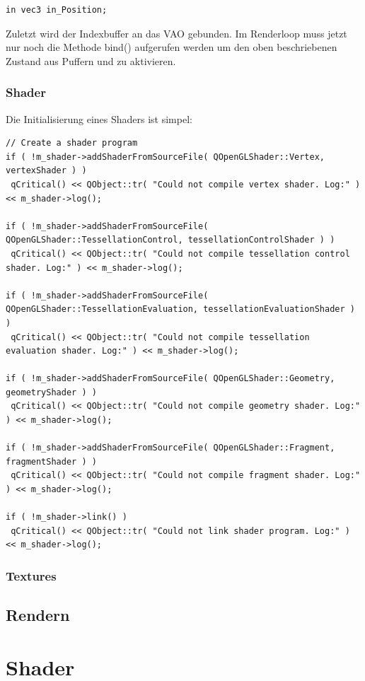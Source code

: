 \documentclass[a4paper,12pt]{article}
\begin{document}
\begin{lstlisting}[frame=single, columns=fullflexible]
in vec3 in_Position;
\end{lstlisting}

Zuletzt wird der Indexbuffer an das VAO gebunden.
Im Renderloop muss jetzt nur noch die Methode bind() aufgerufen werden um den oben beschriebenen Zustand aus Puffern und zu aktivieren. 
\subsubsection{Shader}
Die Initialisierung eines Shaders ist simpel:
\begin{lstlisting}[frame=single, columns=fullflexible]
// Create a shader program
if ( !m_shader->addShaderFromSourceFile( QOpenGLShader::Vertex, vertexShader ) )
 qCritical() << QObject::tr( "Could not compile vertex shader. Log:" ) << m_shader->log();

if ( !m_shader->addShaderFromSourceFile( QOpenGLShader::TessellationControl, tessellationControlShader ) )
 qCritical() << QObject::tr( "Could not compile tessellation control shader. Log:" ) << m_shader->log();

if ( !m_shader->addShaderFromSourceFile( QOpenGLShader::TessellationEvaluation, tessellationEvaluationShader ) )
 qCritical() << QObject::tr( "Could not compile tessellation evaluation shader. Log:" ) << m_shader->log();

if ( !m_shader->addShaderFromSourceFile( QOpenGLShader::Geometry, geometryShader ) )
 qCritical() << QObject::tr( "Could not compile geometry shader. Log:" ) << m_shader->log();

if ( !m_shader->addShaderFromSourceFile( QOpenGLShader::Fragment, fragmentShader ) )
 qCritical() << QObject::tr( "Could not compile fragment shader. Log:" ) << m_shader->log();

if ( !m_shader->link() )
 qCritical() << QObject::tr( "Could not link shader program. Log:" ) << m_shader->log();

\end{lstlisting}

\subsubsection{Textures}
\subsection{Rendern}
\section{Shader}
\end{document}
